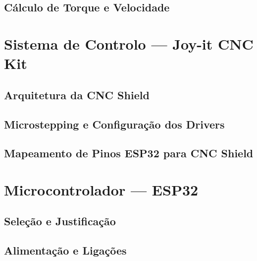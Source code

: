 
\subsection{Cálculo de Torque e Velocidade}
\label{subsec:calculo-torque}



\section{Sistema de Controlo --- Joy-it CNC Kit}
\label{sec:sistema-controlo}


\subsection{Arquitetura da CNC Shield}
\label{subsec:arquitetura-cnc}


\subsection{Microstepping e Configuração dos Drivers}
\label{subsec:microstepping}


\subsection{Mapeamento de Pinos ESP32 para CNC Shield}
\label{subsec:mapeamento-pinos}



\section{Microcontrolador --- ESP32}
\label{sec:microcontrolador}


\subsection{Seleção e Justificação}
\label{subsec:selecao-esp32}


\subsection{Alimentação e Ligações}
\label{subsec:alimentacao-ligacoes}

